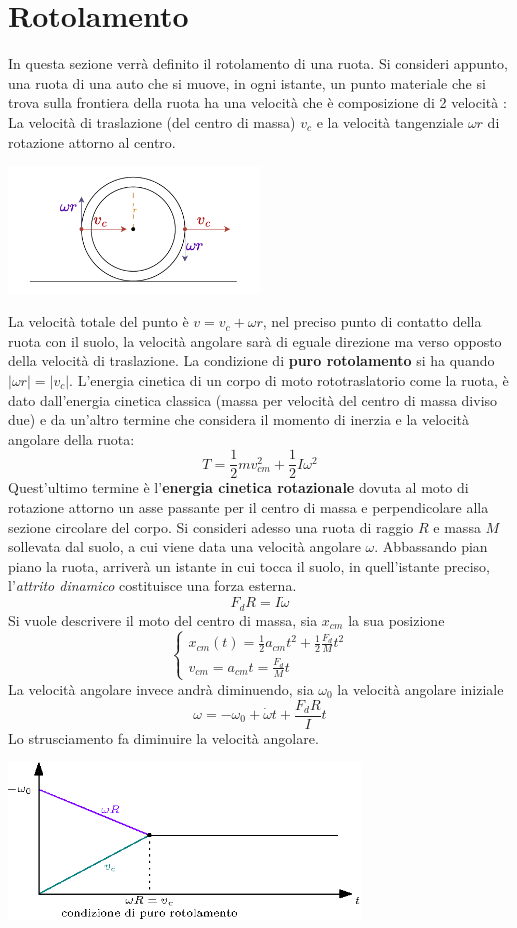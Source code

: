 \documentclass[10pt, letterpaper]{report}
\begin{document}
\section{Rotolamento}
In questa sezione verrà definito il rotolamento di una ruota. Si consideri appunto, una ruota di una auto che si muove, in ogni istante, un punto materiale che si trova sulla frontiera della ruota ha una velocità che è 
composizione di 2 velocità : La velocità di traslazione (del centro di massa) $v_c$ e la velocità tangenziale $\omega r$ di rotazione attorno al centro.
\begin{center}
    \includegraphics[width=0.5\textwidth ]{images/rotolamento.pdf}
\end{center}
La velocità totale del punto è $v=v_c+\omega r$, nel preciso punto di contatto della ruota con il suolo, la velocità angolare sarà di eguale direzione ma verso opposto della velocità di traslazione. La condizione di 
\textbf{puro rotolamento} si ha quando $|\omega r |= |v_c|$. \acc L'energia cinetica di un corpo di moto rototraslatorio come la ruota, è dato dall'energia cinetica classica (massa per velocità del centro di massa diviso due) e da un'altro termine che considera il momento di inerzia e la velocità angolare della ruota: $$T=\frac{1}{2}mv_{cm}^2+\frac{1}{2}I\omega^2 $$
Quest'ultimo termine è l'\textbf{energia cinetica rotazionale} dovuta al moto di rotazione attorno un asse passante per il centro di massa e perpendicolare alla sezione circolare del corpo.\acc
Si consideri adesso una ruota di raggio $R$ e massa $M$ sollevata dal suolo, a cui viene data una velocità angolare $\omega$. Abbassando pian piano la ruota, arriverà un istante in cui tocca il suolo, in quell'istante preciso, 
l'\textit{attrito dinamico} costituisce una forza esterna.
$$ F_dR=I\dot{\omega}$$
Si vuole descrivere il moto del centro di massa, sia $x_{cm}$ la sua posizione 
$$ \begin{cases}
    x_{cm}(t)=\frac{1}{2}a_{cm}t^2+\frac{1}{2}\frac{F_d}{M}t^2 \\ 
    v_{cm}=a_{cm}t=\frac{F_d}{M}t
\end{cases}$$
La velocità angolare invece andrà diminuendo, sia $\omega_0$ la velocità angolare iniziale 
$$ \omega = -\omega_0+\dot{\omega}t+\frac{F_dR}{I}t$$
Lo strusciamento fa diminuire la velocità angolare.
\begin{center}
    \includegraphics[width=0.7\textwidth ]{images/puroRot.eps}
\end{center}
\end{document}
